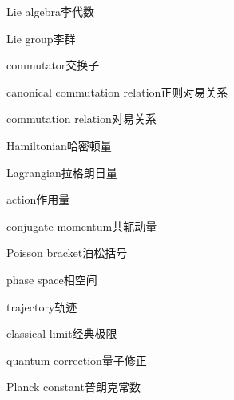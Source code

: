 \begin{multicols}{2}
Lie algebra\hspace{0.9em}李代数\par
Lie group\hspace{0.9em}李群\par
commutator\hspace{0.9em}交换子\par
canonical commutation relation\hspace{0.9em}正则对易关系\par
commutation relation\hspace{0.9em}对易关系\par
Hamiltonian\hspace{0.9em}哈密顿量\par
Lagrangian\hspace{0.9em}拉格朗日量\par
action\hspace{0.9em}作用量\par
conjugate momentum\hspace{0.9em}共轭动量\par
Poisson bracket\hspace{0.9em}泊松括号\par
phase space\hspace{0.9em}相空间\par
trajectory\hspace{0.9em}轨迹\par
classical limit\hspace{0.9em}经典极限\par
quantum correction\hspace{0.9em}量子修正\par
Planck constant\hspace{0.9em}普朗克常数\par
\end{multicols}

